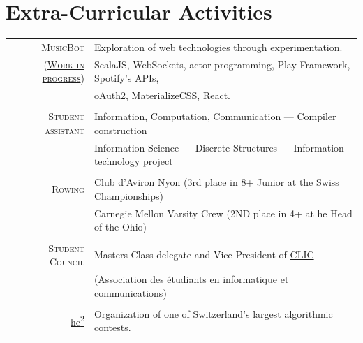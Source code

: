 \documentclass[a4paper,11pt]{article} %
\begin{document}

\section{Extra-Curricular Activities}
\begin{tabular}{rl}

\textsc{\large{\href{https://github.com/paullepoulpe/musicbot}{MusicBot}}} &
Exploration of web technologies through experimentation. \\

\textsc{\large{ (\href{https://musicbot.ch}{Work in progress}) }} &
ScalaJS, WebSockets, actor programming, Play Framework, Spotify's APIs, \\
& oAuth2, MaterializeCSS, React.\\
\multicolumn{2}{c}{} \\

\textsc{\large{Student assistant}} &
Information, Computation, Communication ---
Compiler construction\\
& Information Science --- Discrete Structures ---
Information technology project \\
\multicolumn{2}{c}{} \\

\textsc{\large{Rowing}} &
Club d'Aviron Nyon (3rd place in 8+ Junior at the Swiss Championships)\\
& Carnegie Mellon Varsity Crew (2ND place in 4+ at he Head of the Ohio)\\
\multicolumn{2}{c}{} \\

\textsc{\large{Student Council}} &
Masters Class delegate and Vice-President of
\href{http://clic.epfl.ch/}{CLIC}\\
& (Association des étudiants en informatique et communications)\\
\multicolumn{2}{c}{} \\

\large{\href{http://hc2.ch/}{hc\textsuperscript{2}}} & Organization of one of
Switzerland's largest algorithmic contests.\\
\end{tabular}


\end{document}
